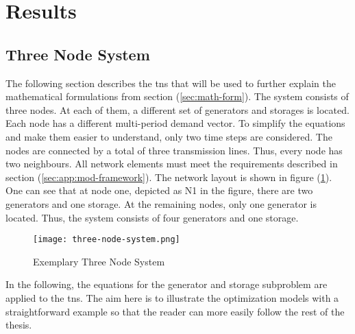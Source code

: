 \section{Results}
\label{sec:res}

\subsection{Three Node System}
\label{sec:res:tns}

The following section describes the \gls{tns} that will be used to further explain the mathematical formulations from section (\ref{sec:math-form}). The system consists of three nodes. At each of them, a different set of generators and storages is located. Each node has a different multi-period demand vector. To simplify the equations and make them easier to understand, only two time steps are considered. The nodes are connected by a total of three transmission lines. Thus, every node has two neighbours. All network elements must meet the requirements described in section (\ref{sec:app:mod-framework}). The network layout is shown in figure (\ref{fig:tns}). One can see that at node one, depicted as N1 in the figure, there are two generators and one storage. At the remaining nodes, only one generator is located. Thus, the system consists of four generators and one storage.

\begin{figure}[h]
	\centering
	\texttt{[image: three-node-system.png]}
	\caption{Exemplary Three Node System}
	\label{fig:tns}
\end{figure}

In the following, the equations for the generator and storage subproblem are applied to the \gls{tns}. The aim here is to illustrate the optimization models with a straightforward example so that the reader can more easily follow the rest of the thesis.